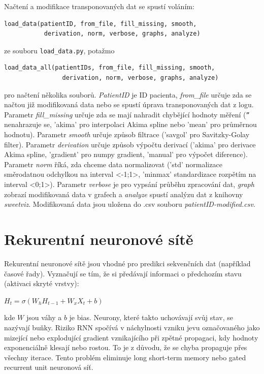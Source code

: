 Načtení a modifikace transponovaných dat se spustí voláním:
\begin{verbatim}
load_data(patientID, from_file, fill_missing, smooth,
           derivation, norm, verbose, graphs, analyze)
\end{verbatim}
ze souboru \texttt{load\_data.py}, potažmo
\begin{verbatim}
load_data_all(patientIDs, from_file, fill_missing, smooth,
                derivation, norm, verbose, graphs, analyze)
\end{verbatim}
pro načtení několika souborů. \textit{PatientID} je ID pacienta, \textit{from\_file} určuje zda se načtou již modifikovaná data nebo se spustí úprava transponovaných dat z logu. Parametr \textit{fill\_missing} určuje zda se mají nahradit chybějící hodnoty měření (\texttt{''} nenahrazuje se, 'akima' pro interpolaci Akima spline nebo 'mean' pro průměrnou hodnotu). Parametr \textit{smooth} určuje způsob filtrace ('savgol' pro Savitzky-Golay filter). Parametr \textit{derivation} určuje způsob výpočtu derivací ('akima' pro derivace Akima spline, 'gradient' pro numpy gradient, 'manual' pro výpočet diference). Parametr \textit{norm} říká, zda chceme data normalizovat ('std' normalizace směrodatnou odchylkou na interval <-1;1>, 'minmax' standardizace rozpětím na interval <0;1>). Parametr \textit{verbose} je pro vypsání průběhu zpracování dat, \textit{graph} zobrazí modifikovaná data v grafech a \textit{analyze} spustí analýzu dat z knihovny \textit{sweetviz}. Modifikovaná data jsou uložena do .csv souboru \textit{patientID-modified.csv}.


\section{Rekurentní neuronové sítě}
\label{ch:lstm}

Rekurentní neuronové sítě jsou vhodné pro predikci sekvenčních dat (například časové řady). Vyznačují se tím, že si předávají informaci o předchozím stavu (aktivaci skryté vrstvy):

$H_{t}=\sigma (W_{h}H_{t-1}+W_{x}X_{t}+b)$

\noindent kde $W$ jsou váhy a $b$ je bias. Neurony, které takto uchovávají svůj stav, se nazývají buňky. Riziko RNN spočívá v náchylnosti vzniku jevu označovaného jako mizející nebo explodující gradient vznikajícího při zpětné propagaci, kdy hodnoty exponenciálně klesají nebo rostou. To je z důvodu, že se chyba propaguje přes všechny iterace. Tento problém eliminuje long short-term memory nebo gated recurrent unit neuronová síť.

